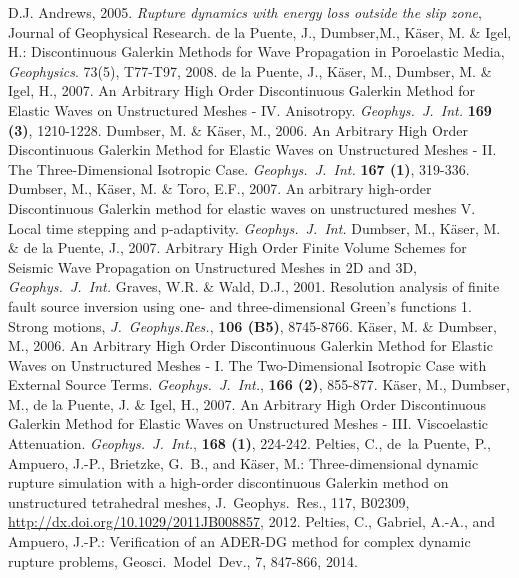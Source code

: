 \documentclass[12pt,twoside]{article}
\begin{document}
\begin{thebibliography}{99}
D.J. Andrews, 2005. \textit{Rupture dynamics with energy loss outside the slip zone}, Journal of Geophysical Research.
  de la Puente, J., Dumbser,M., K\"aser, M. \& Igel, H.: Discontinuous Galerkin Methods for Wave Propagation in Poroelastic Media, \textit{Geophysics}. 73(5), T77-T97, 2008.  
  de la Puente, J., K\"aser, M., Dumbser, M. \& Igel, H., 2007. An Arbitrary High Order Discontinuous 
  Galerkin Method for Elastic Waves on Unstructured Meshes - IV. Anisotropy.
  \textit{Geophys.~J.~Int.} \textbf{169 (3)}, 1210-1228. 
  Dumbser, M. \& K\"aser, M., 2006. An Arbitrary High Order Discontinuous Galerkin Method for 
  Elastic Waves on Unstructured Meshes - II. The Three-Dimensional Isotropic Case. 
  \textit{Geophys.~J.~Int.} \textbf{167 (1)}, 319-336.
  Dumbser, M., K\"aser, M. \& Toro, E.F., 2007. An arbitrary high-order Discontinuous Galerkin method for elastic
  waves on unstructured meshes  V. Local time stepping and p-adaptivity. 
  \textit{Geophys.~J.~Int.}   
  Dumbser, M., K\"aser, M. \& de la Puente, J., 2007. Arbitrary High Order Finite Volume Schemes for Seismic Wave Propagation on 
  Unstructured Meshes in 2D and 3D, 
  \textit{Geophys.~J.~Int.} 
  Graves, W.R. \& Wald, D.J., 2001. Resolution analysis of finite fault source inversion using one- and three-dimensional Green's functions    1. Strong motions, 
  \textit{J.~Geophys.Res.}, \textbf{106 (B5)}, 8745-8766.     
  K\"aser, M. \& Dumbser, M., 2006. An Arbitrary High Order Discontinuous Galerkin Method for 
  Elastic Waves on Unstructured Meshes - I. The Two-Dimensional Isotropic Case with External Source Terms. 
  \textit{Geophys.~J.~Int.}, \textbf{166 (2)}, 855-877.  
  K\"aser, M., Dumbser, M., de la Puente, J. \& Igel, H., 2007. An Arbitrary High Order Discontinuous 
  Galerkin Method for Elastic Waves on Unstructured Meshes - III. Viscoelastic Attenuation. 
  \textit{Geophys.~J.~Int.}, \textbf{168 (1)}, 224-242.  
  Pelties, C., de~la Puente, P., Ampuero, J.-P., Brietzke, G.~B., and K\"aser,
  M.: Three-dimensional dynamic rupture simulation with a high-order
  discontinuous {G}alerkin method on unstructured tetrahedral meshes,
  J.~Geophys.~Res., 117, B02309,
  \url{http://dx.doi.org/10.1029/2011JB008857}, 2012. 
  Pelties, C., Gabriel, A.-A., and  Ampuero, J.-P.:
  Verification of an ADER-DG method for complex dynamic rupture problems,
  Geosci.~Model~Dev., 7, 847-866, 2014.  
\end{thebibliography}
\end{document}
